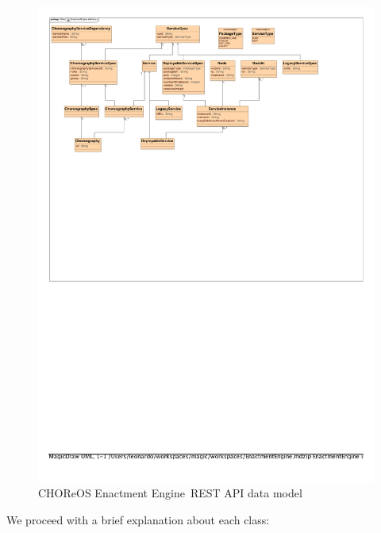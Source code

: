 \documentclass[a4paper, 10pt]{article}
\newcommand{\ee}{CHOReOS Enactment Engine}
\begin{document}
\begin{figure}
\centering
\includegraphics[scale=0.9]{img/data_model.pdf}
\caption{\ee\ REST API data model}
\label{img:data_model}
\end{figure}

We proceed with a brief explanation about each class:
\end{document}
